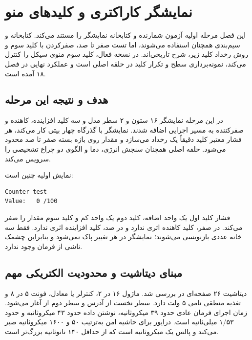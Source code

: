 \chapter{نمایشگر کاراکتری و کلیدهای منو}

این فصل مرحله اولیه آزمون شمارنده و کتابخانه نمایشگر را مستند می‌کند. کتابخانه و سیم‌بندی همچنان استفاده می‌شوند، اما تست صفر تا صد، صفرکردن با کلید سوم و روش رخداد کلید زیر، شرح تاریخی‌اند. در نسخه فعال، کلید سوم منوی سیکل را کنترل می‌کند، نمونه‌برداری سطح و تکرار کلید در حلقه اصلی است و عملکرد نهایی در فصل ۱۸ آمده است.

\section{هدف و نتیجه این مرحله}
در این مرحله نمایشگر ۱۶ ستون و ۲ سطر مدل
و سه کلید افزاینده، کاهنده و صفرکننده به مسیر اجرایی اضافه شدند. نمایشگر با گذرگاه چهار بیتی کار می‌کند، هر فشار معتبر کلید دقیقاً یک رخداد می‌سازد و مقدار روی بازه بسته صفر تا صد محدود می‌شود. حلقه اصلی همچنان سنجش انرژی، دما و الگوی دو چراغ تشخیصی را سرویس می‌کند.

نمایش اولیه چنین است:

\begin{latin}
\begin{lstlisting}
Counter test
Value:   0 /100
\end{lstlisting}
\end{latin}

فشار کلید اول یک واحد اضافه، کلید دوم یک واحد کم و کلید سوم مقدار را صفر می‌کند. در صفر، کلید کاهنده اثری ندارد و در صد، کلید افزاینده اثری ندارد. فقط سه خانه عددی بازنویسی می‌شوند؛ نمایشگر در هر تغییر پاک نمی‌شود و بنابراین چشمک ناشی از فرمان  وجود ندارد.

\section{مبنای دیتاشیت و محدودیت الکتریکی مهم}
دیتاشیت ۲۶ صفحه‌ای  در
بررسی شد. ماژول ۱۶ در ۲، کنترلر  یا معادل، فونت ۵ در ۸ و تغذیه منطقی نامی ۵ ولت دارد. سطر نخست از آدرس  و سطر دوم از  آغاز می‌شود. زمان اجرای فرمان عادی حدود ۳۹ میکروثانیه، نوشتن داده حدود ۴۳ میکروثانیه و  حدود ۱/۵۳ میلی‌ثانیه است. درایور برای حاشیه امن به‌ترتیب ۵۰ و ۱۶۰۰ میکروثانیه صبر می‌کند و پالس  یک میکروثانیه است که از حداقل ۱۴۰ نانوثانیه بزرگ‌تر است.


